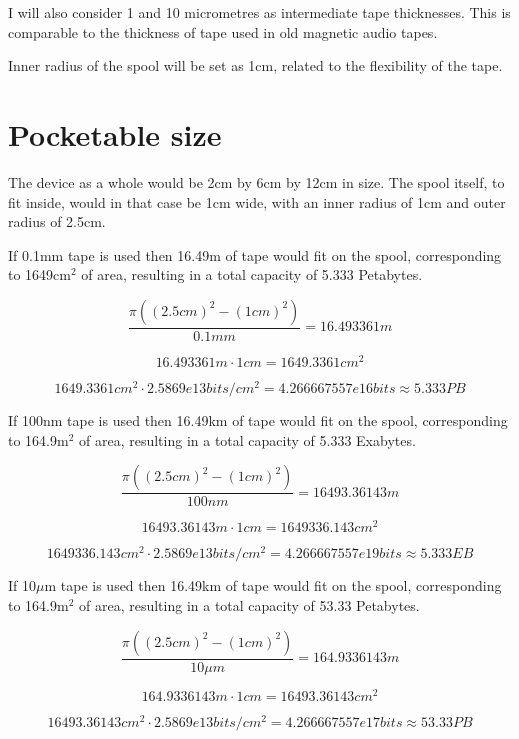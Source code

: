 \documentclass[a4paper]{article}
\begin{document}
	\medskip
	
	I will also consider 1 and 10 micrometres as intermediate tape thicknesses. This is comparable to the thickness of tape used in old magnetic audio tapes.
	
	\bigskip
	
	Inner radius of the spool will be set as 1cm, related to the flexibility of the tape.
	
	\pagebreak
	
	\section{Pocketable size}
	
	The device as a whole would be 2cm by 6cm by 12cm in size. The spool itself, to fit inside, would in that case be 1cm wide, with an inner radius of 1cm and outer radius of 2.5cm. 
	
	\vfill
	
	If 0.1mm tape is used then 16.49m of tape would fit on the spool, corresponding to 1649cm$^2$ of area, resulting in a total capacity of 5.333 Petabytes.
	
	$$ \frac{\pi ((2.5cm)^2 - (1cm)^2)}{0.1mm} =  16.493361m$$
	
	$$ 16.493361m \cdot 1cm =  1649.3361cm^2 $$
	
	$$ 1649.3361cm^2 \cdot 2.5869e13bits/cm^2 = 4.266667557e16 bits \approx 5.333PB $$
	
	\vfill
	
	If 100nm tape is used then 16.49km of tape would fit on the spool, corresponding to 164.9m$^2$ of area, resulting in a total capacity of 5.333 Exabytes.
	
	$$ \frac{\pi ((2.5cm)^2 - (1cm)^2)}{100nm} =  16493.36143m$$
	
	$$ 16493.36143m \cdot 1cm =  1649336.143cm^2 $$
	
	$$ 1649336.143cm^2 \cdot 2.5869e13bits/cm^2 = 4.266667557e19 bits \approx 5.333EB $$
	
	\vfill
	
	
	If 10$\mu$m tape is used then 16.49km of tape would fit on the spool, corresponding to 164.9m$^2$ of area, resulting in a total capacity of 53.33 Petabytes.
	
	$$ \frac{\pi ((2.5cm)^2 - (1cm)^2)}{10\mu m} =  164.9336143m$$
	
	$$ 164.9336143m \cdot 1cm =  16493.36143cm^2 $$
	
	$$ 16493.36143cm^2 \cdot 2.5869e13bits/cm^2 = 4.266667557e17 bits \approx 53.33PB $$
	
\end{document}
